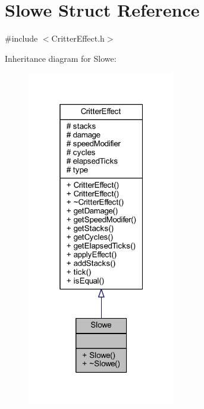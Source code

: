 \hypertarget{struct_slowe}{\section{Slowe Struct Reference}
\label{struct_slowe}
}


{\ttfamily \#include $<$Critter\+Effect.\+h$>$}



Inheritance diagram for Slowe\+:\nopagebreak
\begin{figure}[H]
\begin{center}
\leavevmode
\includegraphics[width=184pt]{struct_slowe__inherit__graph}
\end{center}
\end{figure}


